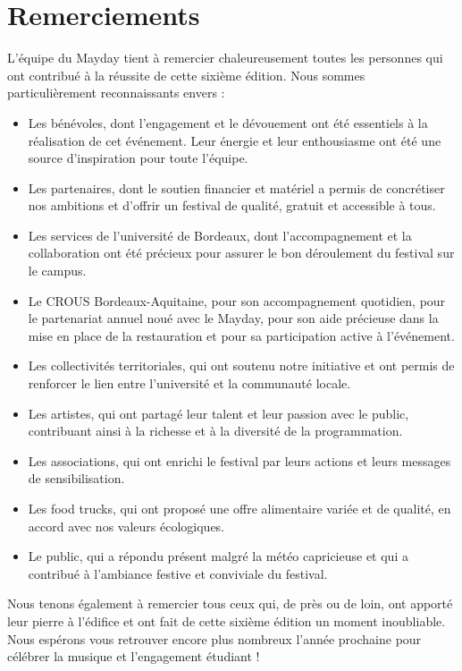 \documentclass[12pt,a4paper]{report}
\begin{document}
\newpage
\section*{Remerciements}

L’équipe du Mayday tient à remercier chaleureusement toutes les personnes qui ont contribué à la réussite de cette sixième édition. Nous sommes particulièrement reconnaissants envers :
\begin{itemize}
\item Les bénévoles, dont l’engagement et le dévouement ont été essentiels à la réalisation de cet événement. Leur énergie et leur enthousiasme ont été une source d’inspiration pour toute l’équipe.
\item Les partenaires, dont le soutien financier et matériel a permis de concrétiser nos ambitions et d’offrir un festival de qualité, gratuit et accessible à tous.
\item Les services de l’université de Bordeaux, dont l’accompagnement et la collaboration ont été précieux pour assurer le bon déroulement du festival sur le campus.
\item Le CROUS Bordeaux-Aquitaine, pour son accompagnement quotidien, pour le partenariat annuel noué avec le Mayday, pour son aide précieuse dans la mise en place de la restauration et pour sa participation active à l’événement.
\item Les collectivités territoriales, qui ont soutenu notre initiative et ont permis de renforcer le lien entre l’université et la communauté locale.
\item Les artistes, qui ont partagé leur talent et leur passion avec le public, contribuant ainsi à la richesse et à la diversité de la programmation.
\item Les associations, qui ont enrichi le festival par leurs actions et leurs messages de sensibilisation.
\item Les food trucks, qui ont proposé une offre alimentaire variée et de qualité, en accord avec nos valeurs écologiques.
\item Le public, qui a répondu présent malgré la météo capricieuse et qui a contribué à l’ambiance festive et conviviale du festival.
\end{itemize}
Nous tenons également à remercier tous ceux qui, de près ou de loin, ont apporté leur pierre à l’édifice et ont fait de cette sixième édition un moment inoubliable. Nous espérons vous retrouver encore plus nombreux l’année prochaine pour célébrer la musique et l’engagement étudiant !
\end{document}
